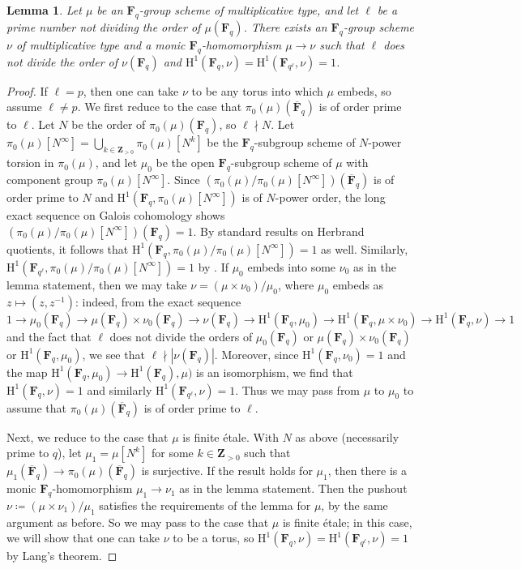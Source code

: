 \documentclass[reqno]{amsart}
\numberwithin{equation}{subsection}
\newcommand{\F}{\mathbf{F}}
\newcommand{\Z}{\mathbf{Z}}
\newcommand{\ol}[1]{\overline{#1}}
\newcommand{\rH}{\ensuremath{\mathrm{H}}\xspace}
\newtheorem{lemma}[thm]{Lemma}
\theoremstyle{remark}
\numberwithin{equation}{subsection}
\numberwithin{figure}{subsection}
\begin{document}
\begin{lemma}\label{lemma:embedding-into-large-tori}
    Let $\mu$ be an $\F_q$-group scheme of multiplicative type, and let $\ell$ be a prime number not dividing the order of $\mu(\F_q)$. There exists an $\F_q$-group scheme $\nu$ of multiplicative type and a monic $\F_q$-homomorphism $\mu \to \nu$ such that $\ell$ does not divide the order of $\nu(\F_q)$ and $\rH^1(\F_q, \nu) = \rH^1(\F_{q^\ell}, \nu) = 1$.
\end{lemma}

\begin{proof}
    If $\ell = p$, then one can take $\nu$ to be any torus into which $\mu$ embeds, so assume $\ell \neq p$. We first reduce to the case that $\pi_0(\mu)(\ol\F_q)$ is of order prime to $\ell$. Let $N$ be the order of $\pi_0(\mu)(\F_q)$, so $\ell \nmid N$. Let $\pi_0(\mu)[N^\infty] = \bigcup_{k \in \Z_{>0}} \pi_0(\mu)[N^k]$ be the $\F_q$-subgroup scheme of $N$-power torsion in $\pi_0(\mu)$, and let $\mu_0$ be the open $\F_q$-subgroup scheme of $\mu$ with component group $\pi_0(\mu)[N^\infty]$. Since $(\pi_0(\mu)/\pi_0(\mu)[N^\infty])(\ol\F_q)$ is of order prime to $N$ and $\rH^1(\F_q, \pi_0(\mu)[N^\infty])$ is of $N$-power order, the long exact sequence on Galois cohomology shows $(\pi_0(\mu)/\pi_0(\mu)[N^\infty])(\F_q) = 1$. By standard results on Herbrand quotients, it follows that $\rH^1(\F_q, \pi_0(\mu)/\pi_0(\mu)[N^\infty]) = 1$ as well. Similarly, $\rH^1(\F_{q^\ell}, \pi_0(\mu)/\pi_0(\mu)[N^\infty]) = 1$ by \cite[Lemma 2.1]{Cot26a}. If $\mu_0$ embeds into some $\nu_0$ as in the lemma statement, then we may take $\nu = (\mu \times \nu_0)/\mu_0$, where $\mu_0$ embeds as $z \mapsto (z, z^{-1})$: indeed, from the exact sequence
    \[
    1 \to \mu_0(\F_q) \to \mu(\F_q) \times \nu_0(\F_q) \to \nu(\F_q) \to \rH^1(\F_q, \mu_0) \to \rH^1(\F_q, \mu \times \nu_0) \to \rH^1(\F_q, \nu) \to 1
    \]
    and the fact that $\ell$ does not divide the orders of $\mu_0(\F_q)$ or $\mu(\F_q) \times \nu_0(\F_q)$ or $\rH^1(\F_q, \mu_0)$, we see that $\ell \nmid |\nu(\F_q)|$. Moreover, since $\rH^1(\F_q,\nu_0) = 1$ and the map $\rH^1(\F_q, \mu_0) \to \rH^1(\F_q), \mu)$ is an isomorphism, we find that $\rH^1(\F_q, \nu) = 1$ and similarly $\rH^1(\F_{q^\ell}, \nu) = 1$. Thus we may pass from $\mu$ to $\mu_0$ to assume that $\pi_0(\mu)(\ol\F_q)$ is of order prime to $\ell$.
    
    Next, we reduce to the case that $\mu$ is finite \'etale. With $N$ as above (necessarily prime to $q$), let $\mu_1 = \mu[N^k]$ for some $k \in \Z_{>0}$ such that $\mu_1(\ol\F_q) \to \pi_0(\mu)(\ol\F_q)$ is surjective. If the result holds for $\mu_1$, then there is a monic $\F_q$-homomorphism $\mu_1 \to \nu_1$ as in the lemma statement. Then the pushout $\nu\coloneqq (\mu \times \nu_1)/\mu_1$ satisfies the requirements of the lemma for $\mu$, by the same argument as before. So we may pass to the case that $\mu$ is finite \'etale; in this case, we will show that one can take $\nu$ to be a torus, so $\rH^1(\F_q, \nu) = \rH^1(\F_{q^\ell}, \nu) = 1$ by Lang's theorem.


\end{proof}
\end{document}

